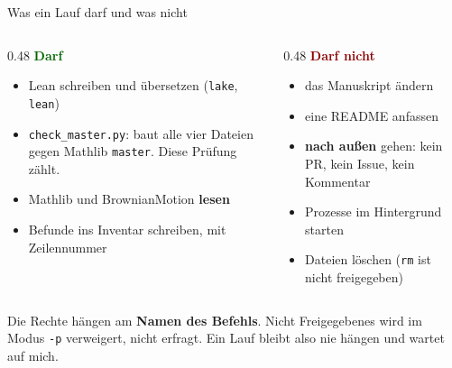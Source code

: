 \documentclass[11pt,aspectratio=169]{beamer}
\newcommand{\datei}[1]{\texttt{#1}}
\begin{document}
\begin{frame}{Was ein Lauf darf und was nicht}
  \begin{columns}[T]
    \begin{column}{0.48\textwidth}
      \textcolor{darkgreen}{\textbf{Darf}}
      \begin{itemize}
      \item Lean schreiben und übersetzen (\texttt{lake}, \texttt{lean})
      \item \datei{check\_master.py}: baut alle vier Dateien gegen Mathlib
        \texttt{master}. Diese Prüfung zählt.
      \item Mathlib und BrownianMotion \textbf{lesen}
      \item Befunde ins Inventar schreiben, mit Zeilennummer
      \end{itemize}
    \end{column}
    \begin{column}{0.48\textwidth}
      \textcolor{darkred}{\textbf{Darf nicht}}
      \begin{itemize}
      \item das Manuskript ändern
      \item eine README anfassen
      \item \textbf{nach außen} gehen: kein PR, kein Issue, kein Kommentar
      \item Prozesse im Hintergrund starten
      \item Dateien löschen (\texttt{rm} ist nicht freigegeben)
      \end{itemize}
    \end{column}
  \end{columns}
  \bigskip
  \small Die Rechte hängen am \textbf{Namen des Befehls}. Nicht Freigegebenes wird im
  Modus \texttt{-p} verweigert, nicht erfragt. Ein Lauf bleibt also nie hängen und
  wartet auf mich.
\end{frame}
\end{document}
